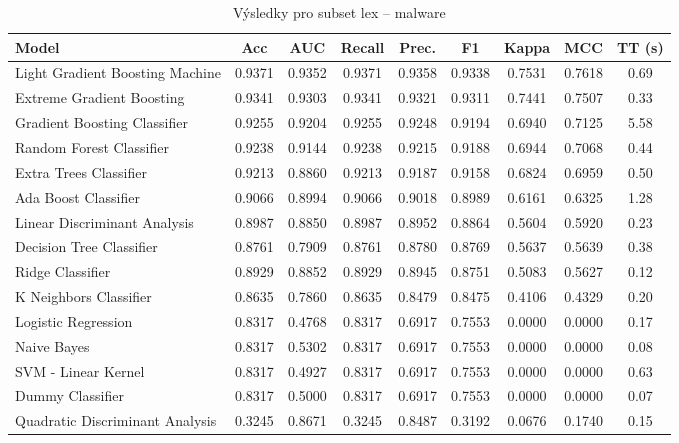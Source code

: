 \begin{table}[H]
  \centering
  \small
  \caption{Výsledky pro subset lex – malware}
  \begin{tabular}{|l|c|c|c|c|c|c|c|c|}
    \hline
    \textbf{Model} & \textbf{Acc} & \textbf{AUC} & \textbf{Recall} & \textbf{Prec.} & \textbf{F1} & \textbf{Kappa} & \textbf{MCC} & \textbf{TT (s)} \\
    \hline
    Light Gradient Boosting Machine & 0.9371 & 0.9352 & 0.9371 & 0.9358 & 0.9338 & 0.7531 & 0.7618 & 0.69 \\
    Extreme Gradient Boosting & 0.9341 & 0.9303 & 0.9341 & 0.9321 & 0.9311 & 0.7441 & 0.7507 & 0.33 \\
    Gradient Boosting Classifier & 0.9255 & 0.9204 & 0.9255 & 0.9248 & 0.9194 & 0.6940 & 0.7125 & 5.58 \\
    Random Forest Classifier & 0.9238 & 0.9144 & 0.9238 & 0.9215 & 0.9188 & 0.6944 & 0.7068 & 0.44 \\
    Extra Trees Classifier & 0.9213 & 0.8860 & 0.9213 & 0.9187 & 0.9158 & 0.6824 & 0.6959 & 0.50 \\
    Ada Boost Classifier & 0.9066 & 0.8994 & 0.9066 & 0.9018 & 0.8989 & 0.6161 & 0.6325 & 1.28 \\
    Linear Discriminant Analysis & 0.8987 & 0.8850 & 0.8987 & 0.8952 & 0.8864 & 0.5604 & 0.5920 & 0.23 \\
    Decision Tree Classifier & 0.8761 & 0.7909 & 0.8761 & 0.8780 & 0.8769 & 0.5637 & 0.5639 & 0.38 \\
    Ridge Classifier & 0.8929 & 0.8852 & 0.8929 & 0.8945 & 0.8751 & 0.5083 & 0.5627 & 0.12 \\
    K Neighbors Classifier & 0.8635 & 0.7860 & 0.8635 & 0.8479 & 0.8475 & 0.4106 & 0.4329 & 0.20 \\
    Logistic Regression & 0.8317 & 0.4768 & 0.8317 & 0.6917 & 0.7553 & 0.0000 & 0.0000 & 0.17 \\
    Naive Bayes & 0.8317 & 0.5302 & 0.8317 & 0.6917 & 0.7553 & 0.0000 & 0.0000 & 0.08 \\
    SVM - Linear Kernel & 0.8317 & 0.4927 & 0.8317 & 0.6917 & 0.7553 & 0.0000 & 0.0000 & 0.63 \\
    Dummy Classifier & 0.8317 & 0.5000 & 0.8317 & 0.6917 & 0.7553 & 0.0000 & 0.0000 & 0.07 \\
    Quadratic Discriminant Analysis & 0.3245 & 0.8671 & 0.3245 & 0.8487 & 0.3192 & 0.0676 & 0.1740 & 0.15 \\
    \hline
  \end{tabular}
\end{table}
\vspace{0.5cm}

